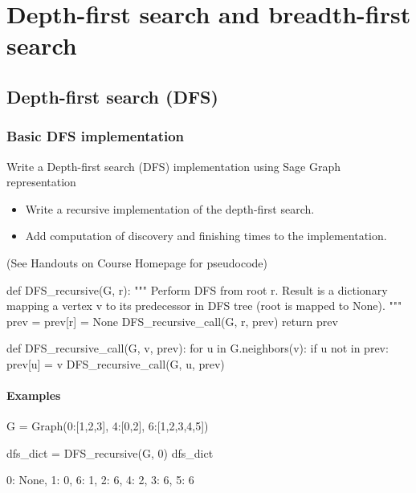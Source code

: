 \chapter{Depth-first search and breadth-first search}

\section{Depth-first search (DFS)}

\subsection{Basic DFS implementation}

Write a Depth-first search (DFS) implementation using Sage Graph representation
\begin{itemize}
  \item Write a recursive implementation of the depth-first search.
  \item Add computation of discovery and finishing times to the implementation.
\end{itemize}
(See Handouts on Course Homepage for pseudocode)

\medskip
\begin{sageCell}
def DFS_recursive(G, r):
    """
    Perform DFS from root r. Result is a dictionary mapping a vertex v to
    its predecessor in DFS tree (root is mapped to None).
    """
    prev = {}
    prev[r] = None
    DFS_recursive_call(G, r, prev)
    return prev

def DFS_recursive_call(G, v, prev):
    for u in G.neighbors(v):
        if u not in prev:
            prev[u] = v
            DFS_recursive_call(G, u, prev)
\end{sageCell}

\subsubsection*{Examples}

\begin{sageCell}
   G = Graph({0:[1,2,3], 4:[0,2], 6:[1,2,3,4,5]})

   dfs_dict = DFS_recursive(G, 0)
   dfs_dict
\end{sageCell}
\begin{outCell}
   {0: None, 1: 0, 6: 1, 2: 6, 4: 2, 3: 6, 5: 6}
\end{outCell}

